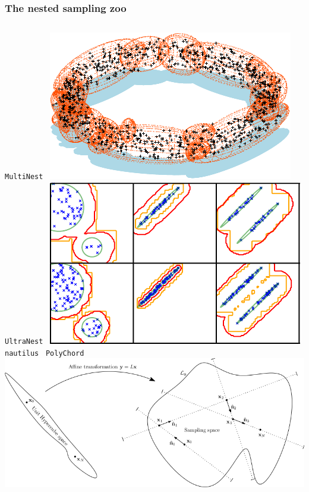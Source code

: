 \documentclass[aspectratio=169]{beamer}
\begin{document}
\begin{frame}
    \frametitle{The nested sampling zoo \hspace{170pt} }
    \begin{columns}[t]
        \texttt{MultiNest}~
        \includegraphics[width=\textwidth]{figures/multinest}
        \texttt{UltraNest}~
        \includegraphics[width=\textwidth]{figures/radfriends}
        \texttt{nautilus}~ 
        \texttt{PolyChord}~
        \includegraphics[width=\textwidth]{figures/polychord}

\end{columns}
\end{frame}
\end{document}

